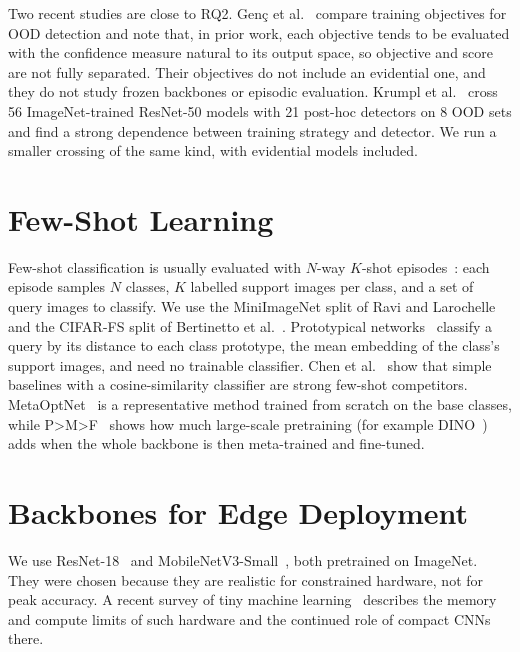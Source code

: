 Two recent studies are close to RQ2. Gen{\c{c}} et al.~\cite{genc2026objectives} compare training
objectives for OOD detection and note that, in prior work, each objective tends to be evaluated with
the confidence measure natural to its output space, so objective and score are not fully separated.
Their objectives do not include an evidential one, and they do not study frozen backbones or episodic
evaluation. Krumpl et al.~\cite{krumpl2026onemodel} cross 56 ImageNet-trained ResNet-50 models with 21
post-hoc detectors on 8 OOD sets and find a strong dependence between training strategy and detector.
We run a smaller crossing of the same kind, with evidential models included.

\section{Few-Shot Learning}

Few-shot classification is usually evaluated with $N$-way $K$-shot episodes~\cite{vinyals2016matching}:
each episode samples $N$ classes, $K$ labelled support images per class, and a set of query images to
classify. We use the MiniImageNet split of Ravi and Larochelle~\cite{ravi2017optimization} and the
CIFAR-FS split of Bertinetto et al.~\cite{bertinetto2019r2d2}. Prototypical networks~\cite{snell2017protonet}
classify a query by its distance to each class prototype, the mean embedding of the class's support
images, and need no trainable classifier. Chen et al.~\cite{chen2019closer} show that simple baselines
with a cosine-similarity classifier are strong few-shot competitors. MetaOptNet~\cite{lee2019metaoptnet}
is a representative method trained from scratch on the base classes, while P>M>F~\cite{hu2022pmf} shows
how much large-scale pretraining (for example DINO~\cite{caron2021dino}) adds when the whole backbone is
then meta-trained and fine-tuned.

\section{Backbones for Edge Deployment}

We use ResNet-18~\cite{he2016resnet} and MobileNetV3-Small~\cite{howard2019mobilenetv3}, both
pretrained on ImageNet. They were chosen because they are realistic for constrained hardware, not for
peak accuracy. A recent survey of tiny machine learning~\cite{somvanshi2025tinydl} describes the memory
and compute limits of such hardware and the continued role of compact CNNs there.

